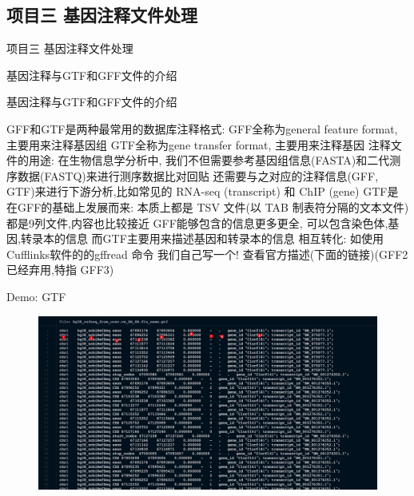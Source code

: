 \subsection{项目三 基因注释文件处理}

\begin{frame}[standout] 项目三 \quad 基因注释文件处理 \end{frame}

\begin{frame}[standout] 基因注释与GTF和GFF文件的介绍 \end{frame}

\begin{frame}[fragile]{基因注释与GTF和GFF文件的介绍}
    \begin{myoutline}
        \1 GFF和GTF是两种最常用的数据库注释格式:
            \2 GFF全称为general feature format, 主要用来注释基因组
            \2 GTF全称为gene transfer format, 主要用来注释基因
        \1 注释文件的用途:
            \2 在生物信息学分析中, 我们不但需要参考基因组信息(FASTA)和二代测序数据(FASTQ)来进行测序数据比对回贴
            \2 还需要与之对应的注释信息(GFF, GTF)来进行下游分析,比如常见的 RNA-seq (transcript) 和 ChIP (gene)
        \1 GTF是在GFF的基础上发展而来:
            \2 本质上都是 TSV 文件(以 TAB 制表符分隔的文本文件)
            \2 都是9列文件,内容也比较接近
            \2 GFF能够包含的信息更多更全, 可以包含染色体,基因,转录本的信息
            \2 而GTF主要用来描述基因和转录本的信息
        \1 相互转化:
            \2 如使用Cufflinks软件的的gffread 命令
            \2 我们自己写一个!
        \1 查看官方描述(下面的链接)(GFF2 已经弃用,特指 GFF3)
    \end{myoutline}
\end{frame}
\begin{frame}{Demo: GTF}
    \begin{figure}
        \centering
        \includegraphics[width=\linewidth]{Images/gtf.png}
    \end{figure}
\end{frame}
